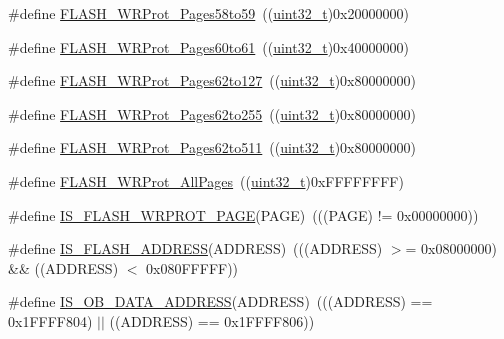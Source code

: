 \begin{DoxyCompactItemize}
\item 
\#define \hyperlink{group___option___bytes___write___protection_ga4a05bf4eec7521ae90ff662db2a9f4f5}{F\+L\+A\+S\+H\+\_\+\+W\+R\+Prot\+\_\+\+Pages58to59}~((\hyperlink{_p_e___types_8h_a33594304e786b158f3fb30289278f5af}{uint32\+\_\+t})0x20000000)
\item 
\#define \hyperlink{group___option___bytes___write___protection_ga22f620be7f346efcb2cbb732b879fd0c}{F\+L\+A\+S\+H\+\_\+\+W\+R\+Prot\+\_\+\+Pages60to61}~((\hyperlink{_p_e___types_8h_a33594304e786b158f3fb30289278f5af}{uint32\+\_\+t})0x40000000)
\item 
\#define \hyperlink{group___option___bytes___write___protection_ga346285408d8f738796fc22d710777ba9}{F\+L\+A\+S\+H\+\_\+\+W\+R\+Prot\+\_\+\+Pages62to127}~((\hyperlink{_p_e___types_8h_a33594304e786b158f3fb30289278f5af}{uint32\+\_\+t})0x80000000)
\item 
\#define \hyperlink{group___option___bytes___write___protection_gacec4a825ff505ef5751ec6e5cf6d941e}{F\+L\+A\+S\+H\+\_\+\+W\+R\+Prot\+\_\+\+Pages62to255}~((\hyperlink{_p_e___types_8h_a33594304e786b158f3fb30289278f5af}{uint32\+\_\+t})0x80000000)
\item 
\#define \hyperlink{group___option___bytes___write___protection_gab233da6081eaf5d664f16c0e8c7df138}{F\+L\+A\+S\+H\+\_\+\+W\+R\+Prot\+\_\+\+Pages62to511}~((\hyperlink{_p_e___types_8h_a33594304e786b158f3fb30289278f5af}{uint32\+\_\+t})0x80000000)
\item 
\#define \hyperlink{group___option___bytes___write___protection_ga6fdaf38a559d606660dd10a411b77ea5}{F\+L\+A\+S\+H\+\_\+\+W\+R\+Prot\+\_\+\+All\+Pages}~((\hyperlink{_p_e___types_8h_a33594304e786b158f3fb30289278f5af}{uint32\+\_\+t})0x\+F\+F\+F\+F\+F\+F\+F\+F)
\item 
\#define \hyperlink{group___option___bytes___write___protection_gafe68b93dfb1ebf68d74f871850ab373b}{I\+S\+\_\+\+F\+L\+A\+S\+H\+\_\+\+W\+R\+P\+R\+O\+T\+\_\+\+P\+A\+GE}(P\+A\+GE)~(((P\+A\+GE) != 0x00000000))
\item 
\#define \hyperlink{group___option___bytes___write___protection_gad0c8166ba15a0b8d458412a8bb74e2f0}{I\+S\+\_\+\+F\+L\+A\+S\+H\+\_\+\+A\+D\+D\+R\+E\+SS}(A\+D\+D\+R\+E\+SS)~(((A\+D\+D\+R\+E\+SS) $>$= 0x08000000) \&\& ((\+A\+D\+D\+R\+E\+S\+S) $<$ 0x080\+F\+F\+F\+F\+F))
\item 
\#define \hyperlink{group___option___bytes___write___protection_ga73fcac8d5f301a5c98518374ae926633}{I\+S\+\_\+\+O\+B\+\_\+\+D\+A\+T\+A\+\_\+\+A\+D\+D\+R\+E\+SS}(A\+D\+D\+R\+E\+SS)~(((A\+D\+D\+R\+E\+SS) == 0x1\+F\+F\+F\+F804) $\vert$$\vert$ ((\+A\+D\+D\+R\+E\+S\+S) == 0x1\+F\+F\+F\+F806))
$$
\end{DoxyCompactItemize}
